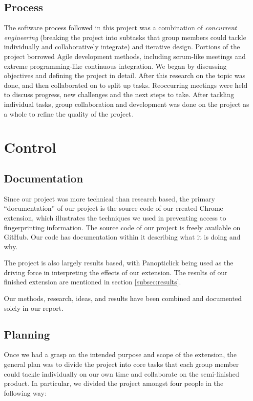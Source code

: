 \documentclass[12pt,a4paper]{article}
\begin{document}
\subsection{Process}
The software process followed in this project was a combination of \textit{concurrent engineering} (breaking the project into subtasks that group members could tackle individually and collaboratively integrate) and iterative design. Portions of the project borrowed Agile development methods, including scrum-like meetings and extreme programming-like continuous integration. We began by discussing objectives and defining the project in detail. After this research on the topic was done, and then collaborated on to split up tasks. Reoccurring meetings were held to discuss progress, new challenges and the next steps to take. After tackling individual tasks, group collaboration and development was done on the project as a whole to refine the quality of the project.

\section{Control}
\subsection{Documentation}
Since our project was more technical than research based, the primary ``documentation'' of our project is the source code of our created Chrome extension, which illustrates the techniques we used in preventing access to fingerprinting information. The source code of our project is freely available on GitHub\cite{github}. Our code has documentation within it describing what it is doing and why.

The project is also largely results based, with Panopticlick being used as the driving force in interpreting the effects of our extension. The results of our finished extension are mentioned in section \ref{subsec:results}.

Our methods, research, ideas, and results have been combined and documented solely in our report. 

\subsection{Planning}
Once we had a grasp on the intended purpose and scope of the extension, the general plan was to divide the project into core tasks that each group member could tackle individually on our own time and collaborate on the semi-finished product. In particular, we divided the project amongst four people in the following way:
\end{document}
